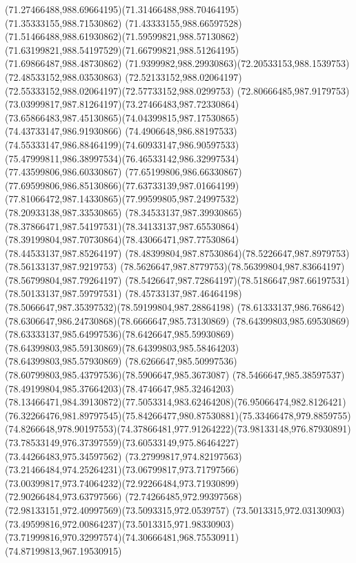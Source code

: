 {{\curveto(71.27466488,988.69664195)(71.31466488,988.70464195)(71.35333155,988.71530862)
\curveto(71.43333155,988.66597528)(71.51466488,988.61930862)(71.59599821,988.57130862)
\curveto(71.63199821,988.54197529)(71.66799821,988.51264195)(71.69866487,988.48730862)
\curveto(71.9399982,988.29930863)(72.20533153,988.1539753)(72.48533152,988.03530863)
\curveto(72.52133152,988.02064197)(72.55333152,988.02064197)(72.57733152,988.0299753)
\curveto(72.80666485,987.9179753)(73.03999817,987.81264197)(73.27466483,987.72330864)
\curveto(73.65866483,987.45130865)(74.04399815,987.17530865)(74.43733147,986.91930866)
\curveto(74.4906648,986.88197533)(74.55333147,986.88464199)(74.60933147,986.90597533)
\curveto(75.47999811,986.38997534)(76.46533142,986.32997534)(77.43599806,986.60330867)
\curveto(77.65199806,986.66330867)(77.69599806,986.85130866)(77.63733139,987.01664199)
\curveto(77.81066472,987.14330865)(77.99599805,987.24997532)(78.20933138,987.33530865)
\curveto(78.34533137,987.39930865)(78.37866471,987.54197531)(78.34133137,987.65530864)
\curveto(78.39199804,987.70730864)(78.43066471,987.77530864)(78.44533137,987.85264197)
\curveto(78.48399804,987.87530864)(78.5226647,987.8979753)(78.56133137,987.9219753)
\curveto(78.5626647,987.8779753)(78.56399804,987.83664197)(78.56799804,987.79264197)
\curveto(78.5426647,987.72864197)(78.5186647,987.66197531)(78.50133137,987.59797531)
\curveto(78.45733137,987.46464198)(78.5066647,987.35397532)(78.59199804,987.28864198)
\curveto(78.61333137,986.768642)(78.6306647,986.24730868)(78.6666647,985.73130869)
\curveto(78.64399803,985.69530869)(78.63333137,985.64997536)(78.6426647,985.59930869)
\curveto(78.64399803,985.59130869)(78.64399803,985.58464203)(78.64399803,985.57930869)
\curveto(78.6266647,985.50997536)(78.60799803,985.43797536)(78.5906647,985.3673087)
\curveto(78.5466647,985.38597537)(78.49199804,985.37664203)(78.4746647,985.32464203)
\curveto(78.13466471,984.39130872)(77.5053314,983.62464208)(76.95066474,982.8126421)
\curveto(76.32266476,981.89797545)(75.84266477,980.87530881)(75.33466478,979.8859755)
\curveto(74.8266648,978.90197553)(74.37866481,977.91264222)(73.98133148,976.87930891)
\curveto(73.78533149,976.37397559)(73.60533149,975.86464227)(73.44266483,975.34597562)
\curveto(73.27999817,974.82197563)(73.21466484,974.25264231)(73.06799817,973.71797566)
\curveto(73.00399817,973.74064232)(72.92266484,973.71930899)(72.90266484,973.63797566)
\curveto(72.74266485,972.99397568)(72.98133151,972.40997569)(73.5093315,972.0539757)
\curveto(73.5013315,972.03130903)(73.49599816,972.00864237)(73.5013315,971.98330903)
\curveto(73.71999816,970.32997574)(74.30666481,968.75530911)(74.87199813,967.19530915)
}}

